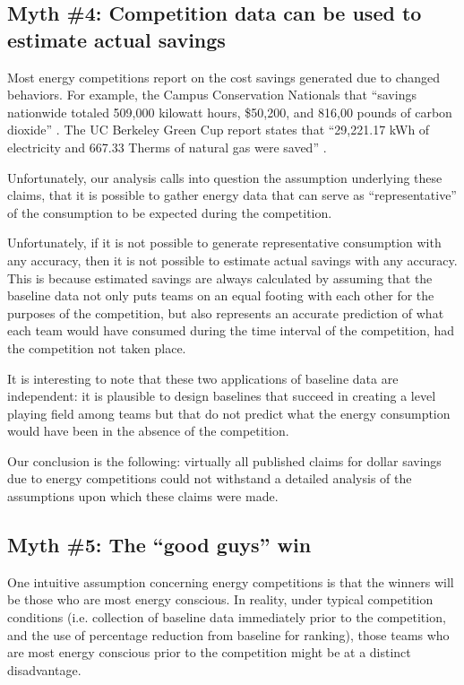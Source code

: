 \documentclass[jou]{apa} %
\begin{document}
\subsection{Myth \#4: Competition data can be used to estimate actual savings}

Most energy competitions report on the cost savings generated due to changed behaviors.
For example, the Campus Conservation Nationals that ``savings nationwide totaled 509,000
kilowatt hours, \$50,200, and 816,00 pounds of carbon dioxide'' \cite{Willens2010}.  The UC
Berkeley Green Cup report states that ``29,221.17 kWh of electricity and 667.33 Therms of
natural gas were saved'' \cite{Dhong2011}.

Unfortunately, our analysis calls into question the assumption underlying these claims,
that it is possible to gather energy data that can serve as ``representative'' of the
consumption to be expected during the competition. 

Unfortunately, if it is not possible to generate representative consumption with any
accuracy, then it is not possible to estimate actual savings with any accuracy.  This is
because estimated savings are always calculated by assuming that the baseline data not
only puts teams on an equal footing with each other for the purposes of the competition,
but also represents an accurate prediction of what each team would have consumed during
the time interval of the competition, had the competition not taken place.  

It is interesting to note that these two applications of baseline data are
independent: it is plausible to design baselines that succeed in creating a
level playing field among teams but that do not predict what the energy
consumption would have been in the absence of the competition.

Our conclusion is the following: virtually all published claims for dollar savings due to
energy competitions could not withstand a detailed analysis of the assumptions upon which
these claims were made.  

\subsection{Myth \#5: The ``good guys'' win}

One intuitive assumption concerning energy competitions is that the winners will be those
who are most energy conscious.  In reality, under typical competition conditions
(i.e. collection of baseline data immediately prior to the competition, and the use of
percentage reduction from baseline for ranking), those teams who are most energy conscious
prior to the competition might be at a distinct disadvantage.
\end{document}
